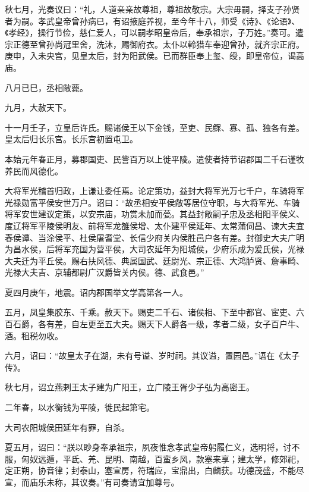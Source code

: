 \documentclass[12pt,UTF8]{ctexbook}
\begin{document}
秋七月，光奏议曰：“礼，人道亲亲故尊祖，尊祖故敬宗。大宗毋嗣，择支子孙贤者为嗣。孝武皇帝曾孙病已，有诏掖庭养视，至今年十八，师受《诗》、《论语》、《孝经》，操行节俭，慈仁爱人，可以嗣孝昭皇帝后，奉承祖宗，子万姓。”奏可。遣宗正德至曾孙尚冠里舍，洗沐，赐御府衣。太仆以軨猎车奉迎曾孙，就齐宗正府。庚申，入未央宫，见皇太后，封为阳武侯。已而群臣奉上玺、绶，即皇帝位，谒高庙。



八月已巳，丞相敞薨。



九月，大赦天下。



十一月壬子，立皇后许氏。赐诸侯王以下金钱，至吏、民鳏、寡、孤、独各有差。皇太后归长乐宫。长乐宫初置屯卫。



本始元年春正月，募郡国吏、民訾百万以上徙平陵。遣使者持节诏郡国二千石谨牧养民而风德化。



大将军光稽首归政，上谦让委任焉。论定策功，益封大将军光万七千户，车骑将军光禄勋富平侯安世万户。诏曰：“故丞相安平侯敞等居位守职，与大将军光、车骑将军安世建议定策，以安宗庙，功赏未加而甍。其益封敞嗣子忠及丞相阳平侯义、度辽将军平陵侯明友、前将军龙雒侯增、太仆建平侯延年、太常蒲伺昌、谏大夫宜春侯谭、当涂侯平、杜侯屠耆堂、长信少府关内侯胜邑户各有差。封御史大夫广明为昌水侯，后将军充国为营平侯，大司农延年为阳城侯，少府乐成为爰氏侯，光禄大夫迁为平丘侯。赐右扶风德、典属国武、廷尉光、宗正德、大鸿胪贤、詹事畸、光禄大夫吉、京辅都尉广汉爵皆关内侯。德、武食邑。”



夏四月庚午，地震。诏内郡国举文学高第各一人。



五月，凤皇集胶东、千乘。赦天下。赐吏二千石、诸侯相、下至中都官、宦吏、六百石爵，各有差，自左更至五大夫。赐天下人爵各一级，孝者二级，女子百户牛、酒。租税勿收。



六月，诏曰：“故皇太子在湖，未有号谥、岁时祠。其议谥，置园邑。”语在《太子传》。



秋七月，诏立燕剌王太子建为广阳王，立广陵王胥少子弘为高密王。



二年春，以水衡钱为平陵，徙民起第宅。



大司农阳城侯田延年有罪，自杀。



夏五月，诏曰：“朕以眇身奉承祖宗，夙夜惟念孝武皇帝躬履仁义，选明将，讨不服，匈奴远遁，平氐、羌、昆明、南越，百蛮乡风，款塞来享；建太学，修郊祀，定正朔，协音律；封泰山，塞宣房，符瑞应，宝鼎出，白麟获。功德茂盛，不能尽宣，而庙乐未称，其议奏。”有司奏请宜加尊号。
\end{document}
